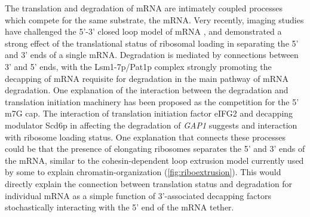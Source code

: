 The translation and degradation of mRNA are intimately coupled
processes which compete for the same substrate, the mRNA. 
Very recently, imaging studies have challenged the 5'-3' closed loop
model of mRNA \parencite{adivarahan2017spatial}, and demonstrated
a strong effect of the translational status of ribosomal loading in 
separating the 5' and 3' ends of a single mRNA.
Degradation is mediated by connections between 3' and 5' ends, 
with the Lsm1-7p/Pat1p complex strongly promoting the decapping of
mRNA requisite for degradation in the main pathway of mRNA
degradation.
One explanation of the interaction between the degradation and
translation initiation machinery has been proposed as the competition
for the 5' m7G cap. 
The interaction of translation initiation factor eIFG2 and
decapping modulator Scd6p in affecting the degradation of
\textit{GAP1} suggests and interaction with ribosome loading status.
One explanation that connects these processes could be that the presence
of elongating ribosomes separates the 5' and 3' ends of the mRNA, 
similar to the cohesin-dependent loop extrusion model currently used 
by some to explain chromatin-organization (\autoref{fig:riboextrusion}).
This would directly explain the connection between translation status
and degradation for individual mRNA as a simple function of 
3'-associated decapping factors stochastically interacting with 
the 5' end of the mRNA tether.

